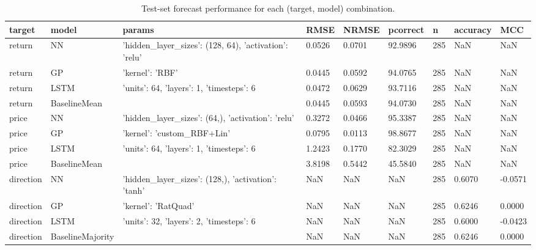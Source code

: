 \begin{table}[H]
\centering
\small
\begin{tabular}{lllllllll}
\toprule
target & model & params & RMSE & NRMSE & pcorrect & n & accuracy & MCC \\
\midrule
return & NN & {'hidden_layer_sizes': (128, 64), 'activation': 'relu'} & 0.0526 & 0.0701 & 92.9896 & 285 & NaN & NaN \\
return & GP & {'kernel': 'RBF'} & 0.0445 & 0.0592 & 94.0765 & 285 & NaN & NaN \\
return & LSTM & {'units': 64, 'layers': 1, 'timesteps': 6} & 0.0472 & 0.0629 & 93.7116 & 285 & NaN & NaN \\
return & BaselineMean & {} & 0.0445 & 0.0593 & 94.0730 & 285 & NaN & NaN \\
price & NN & {'hidden_layer_sizes': (64,), 'activation': 'relu'} & 0.3272 & 0.0466 & 95.3387 & 285 & NaN & NaN \\
price & GP & {'kernel': 'custom_RBF+Lin'} & 0.0795 & 0.0113 & 98.8677 & 285 & NaN & NaN \\
price & LSTM & {'units': 64, 'layers': 1, 'timesteps': 6} & 1.2423 & 0.1770 & 82.3029 & 285 & NaN & NaN \\
price & BaselineMean & {} & 3.8198 & 0.5442 & 45.5840 & 285 & NaN & NaN \\
direction & NN & {'hidden_layer_sizes': (128,), 'activation': 'tanh'} & NaN & NaN & NaN & 285 & 0.6070 & -0.0571 \\
direction & GP & {'kernel': 'RatQuad'} & NaN & NaN & NaN & 285 & 0.6246 & 0.0000 \\
direction & LSTM & {'units': 32, 'layers': 2, 'timesteps': 6} & NaN & NaN & NaN & 285 & 0.6000 & -0.0423 \\
direction & BaselineMajority & {} & NaN & NaN & NaN & 285 & 0.6246 & 0.0000 \\
\bottomrule
\end{tabular}
\caption{Test-set forecast performance for each (target, model) combination.}
\label{tab:ex2_metrics}
\end{table}
